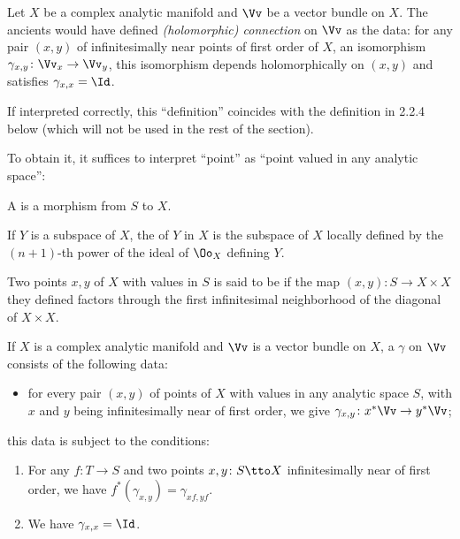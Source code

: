 \begin{para}
  Let $X$ be a complex analytic manifold and $\Vv$ be a vector bundle on $X$.
  The ancients would have defined \emph{ (holomorphic) connection} on $\Vv$
  as the data: for any pair $(x,y)$ of infinitesimally near points of
  first order of $X$, an isomorphism $\gamma_{x,y}\colon\Vv_x\to\Vv_y$,
  this isomorphism depends holomorphically on $(x,y)$ and satisfies
  $\gamma_{x,x}=\Id$.

  If interpreted correctly, this ``definition'' coincides with the definition in
  2.2.4 below (which will not be used in the rest of the section).

  To obtain it, it suffices to interpret ``point'' as
  ``point valued in any analytic space'':
  \begin{subpara}
    A  is a morphism from $S$ to $X$.
  \end{subpara}
  \begin{subpara}
    If $Y$ is a subspace of $X$, the 
    of $Y$ in $X$ is the subspace of $X$ locally defined by the $(n+1)$-th power
    of the ideal of $\Oo_X$ defining $Y$.
  \end{subpara}
  \begin{subpara}
    Two points $x,y$ of $X$ with values in $S$ is said to be
     if
    the map $(x,y)\colon S\to X\times X$ they defined factors through the
    first infinitesimal neighborhood of the diagonal of $X\times X$.
  \end{subpara}
  \begin{subpara}\label{defn:(holomorphic)_connection}
    If $X$ is a complex analytic manifold and $\Vv$ is a vector bundle on $X$,
    a  $\gamma$ on $\Vv$ consists of
    the following data:
    \begin{itemize}
      \item for every pair $(x,y)$ of points of $X$ with values in any analytic
      space $S$, with $x$ and $y$ being infinitesimally near of first order,
      we give $\gamma_{x,y}\colon x^\ast\Vv\to y^\ast\Vv$;
    \end{itemize}
    this data is subject to the conditions:
    \begin{enumerate}
      \item For any $f\colon T\to S$ and two points $x,y\colon S\tto X$
      infinitesimally near of first order, we have
      $f^\ast(\gamma_{x,y})=\gamma_{xf,yf}$.
      \item We have $\gamma_{x,x}=\Id$.
    \end{enumerate}
  \end{subpara}
\end{para}

